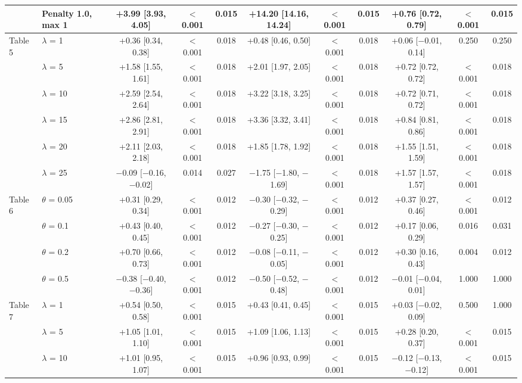 \begin{table}[!htb]
{\begin{tabular}{llccccccccc}
 & Penalty 1.0, max 1 & +3.99 [3.93, 4.05] & $<$0.001 & 0.015 & +14.20 [14.16, 14.24] & $<$0.001 & 0.015 & +0.76 [0.72, 0.79] & $<$0.001 & 0.015 \\
\midrule
\multirow{6}{*}{Table 5} & $\lambda$ = 1 & +0.36 [0.34, 0.38] & $<$0.001 & 0.018 & +0.48 [0.46, 0.50] & $<$0.001 & 0.018 & +0.06 [$-$0.01, 0.14] & 0.250 & 0.250 \\
 & $\lambda$ = 5 & +1.58 [1.55, 1.61] & $<$0.001 & 0.018 & +2.01 [1.97, 2.05] & $<$0.001 & 0.018 & +0.72 [0.72, 0.72] & $<$0.001 & 0.018 \\
 & $\lambda$ = 10 & +2.59 [2.54, 2.64] & $<$0.001 & 0.018 & +3.22 [3.18, 3.25] & $<$0.001 & 0.018 & +0.72 [0.71, 0.72] & $<$0.001 & 0.018 \\
 & $\lambda$ = 15 & +2.86 [2.81, 2.91] & $<$0.001 & 0.018 & +3.36 [3.32, 3.41] & $<$0.001 & 0.018 & +0.84 [0.81, 0.86] & $<$0.001 & 0.018 \\
 & $\lambda$ = 20 & +2.11 [2.03, 2.18] & $<$0.001 & 0.018 & +1.85 [1.78, 1.92] & $<$0.001 & 0.018 & +1.55 [1.51, 1.59] & $<$0.001 & 0.018 \\
 & $\lambda$ = 25 & $-$0.09 [$-$0.16, $-$0.02] & 0.014 & 0.027 & $-$1.75 [$-$1.80, $-$1.69] & $<$0.001 & 0.018 & +1.57 [1.57, 1.57] & $<$0.001 & 0.018 \\
\midrule
\multirow{4}{*}{Table 6} & $\theta$ = 0.05 & +0.31 [0.29, 0.34] & $<$0.001 & 0.012 & $-$0.30 [$-$0.32, $-$0.29] & $<$0.001 & 0.012 & +0.37 [0.27, 0.46] & $<$0.001 & 0.012 \\
 & $\theta$ = 0.1 & +0.43 [0.40, 0.45] & $<$0.001 & 0.012 & $-$0.27 [$-$0.30, $-$0.25] & $<$0.001 & 0.012 & +0.17 [0.06, 0.29] & 0.016 & 0.031 \\
 & $\theta$ = 0.2 & +0.70 [0.66, 0.73] & $<$0.001 & 0.012 & $-$0.08 [$-$0.11, $-$0.05] & $<$0.001 & 0.012 & +0.30 [0.16, 0.43] & 0.004 & 0.012 \\
 & $\theta$ = 0.5 & $-$0.38 [$-$0.40, $-$0.36] & $<$0.001 & 0.012 & $-$0.50 [$-$0.52, $-$0.48] & $<$0.001 & 0.012 & $-$0.01 [$-$0.04, 0.01] & 1.000 & 1.000 \\
\midrule
\multirow{5}{*}{Table 7} & $\lambda$ = 1 & +0.54 [0.50, 0.58] & $<$0.001 & 0.015 & +0.43 [0.41, 0.45] & $<$0.001 & 0.015 & +0.03 [$-$0.02, 0.09] & 0.500 & 1.000 \\
 & $\lambda$ = 5 & +1.05 [1.01, 1.10] & $<$0.001 & 0.015 & +1.09 [1.06, 1.13] & $<$0.001 & 0.015 & +0.28 [0.20, 0.37] & $<$0.001 & 0.015 \\
 & $\lambda$ = 10 & +1.01 [0.95, 1.07] & $<$0.001 & 0.015 & +0.96 [0.93, 0.99] & $<$0.001 & 0.015 & $-$0.12 [$-$0.13, $-$0.12] & $<$0.001 & 0.015 \\

\end{tabular}}
\end{table}
